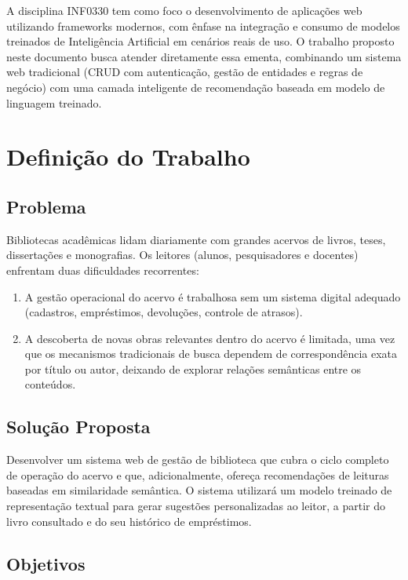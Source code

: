 A disciplina INF0330 tem como foco o desenvolvimento de aplicações web utilizando frameworks modernos, com ênfase na integração e consumo de modelos treinados de Inteligência Artificial em cenários reais de uso. O trabalho proposto neste documento busca atender diretamente essa ementa, combinando um sistema web tradicional (CRUD com autenticação, gestão de entidades e regras de negócio) com uma camada inteligente de recomendação baseada em modelo de linguagem treinado.

\section{Definição do Trabalho}

\subsection{Problema}

Bibliotecas acadêmicas lidam diariamente com grandes acervos de livros, teses, dissertações e monografias. Os leitores (alunos, pesquisadores e docentes) enfrentam duas dificuldades recorrentes:

\begin{enumerate}
    \item A gestão operacional do acervo é trabalhosa sem um sistema digital adequado (cadastros, empréstimos, devoluções, controle de atrasos).
    \item A descoberta de novas obras relevantes dentro do acervo é limitada, uma vez que os mecanismos tradicionais de busca dependem de correspondência exata por título ou autor, deixando de explorar relações semânticas entre os conteúdos.
\end{enumerate}

\subsection{Solução Proposta}

Desenvolver um sistema web de gestão de biblioteca que cubra o ciclo completo de operação do acervo e que, adicionalmente, ofereça recomendações de leituras baseadas em similaridade semântica. O sistema utilizará um modelo treinado de representação textual para gerar sugestões personalizadas ao leitor, a partir do livro consultado e do seu histórico de empréstimos.

\subsection{Objetivos}

